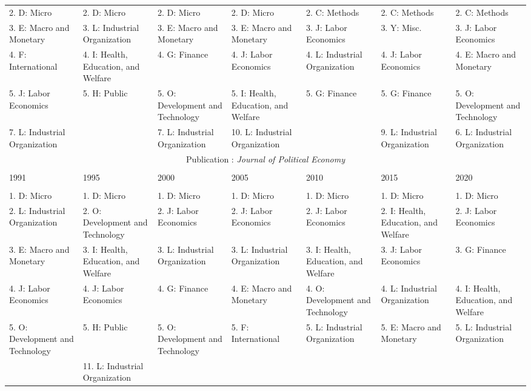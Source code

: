 \begin{table}[h]
\begin{adjustbox}{max width = \textwidth}
\begin{tabular}{@{\extracolsep{5pt}} lllllll}
2. D: Micro & 2. D: Micro & 2. D: Micro & 2. D: Micro & 2. C: Methods & 2. C: Methods & 2. C: Methods \\ 
3. E: Macro and Monetary & 3. L: Industrial Organization & 3. E: Macro and Monetary & 3. E: Macro and Monetary & 3. J: Labor Economics & 3. Y: Misc. & 3. J: Labor Economics \\ 
4. F: International & 4. I: Health, Education, and Welfare & 4. G: Finance & 4. J: Labor Economics & 4. L: Industrial Organization & 4. J: Labor Economics & 4. E: Macro and Monetary \\ 
5. J: Labor Economics & 5. H: Public & 5. O: Development and Technology & 5. I: Health, Education, and Welfare & 5. G: Finance & 5. G: Finance & 5. O: Development and Technology \\ 
7. L: Industrial Organization &  & 7. L: Industrial Organization & 10. L: Industrial Organization &  & 9. L: Industrial Organization & 6. L: Industrial Organization \\ 

 \multicolumn{7}{c}{Publication : \textit{Journal of Political Economy}} \\
 \cline{1-7} \\
1991 & 1995 & 2000 & 2005 & 2010 & 2015 & 2020 \\ 
\hline \\[-1.8ex] 
1. D: Micro & 1. D: Micro & 1. D: Micro & 1. D: Micro & 1. D: Micro & 1. D: Micro & 1. D: Micro \\ 
2. L: Industrial Organization & 2. O: Development and Technology & 2. J: Labor Economics & 2. J: Labor Economics & 2. J: Labor Economics & 2. I: Health, Education, and Welfare & 2. J: Labor Economics \\ 
3. E: Macro and Monetary & 3. I: Health, Education, and Welfare & 3. L: Industrial Organization & 3. L: Industrial Organization & 3. I: Health, Education, and Welfare & 3. J: Labor Economics & 3. G: Finance \\ 
4. J: Labor Economics & 4. J: Labor Economics & 4. G: Finance & 4. E: Macro and Monetary & 4. O: Development and Technology & 4. L: Industrial Organization & 4. I: Health, Education, and Welfare \\ 
5. O: Development and Technology & 5. H: Public & 5. O: Development and Technology & 5. F: International & 5. L: Industrial Organization & 5. E: Macro and Monetary & 5. L: Industrial Organization \\ 
 & 11. L: Industrial Organization &  &  &  &  &  \\ 


\end{tabular}
\end{adjustbox}
\end{table}

